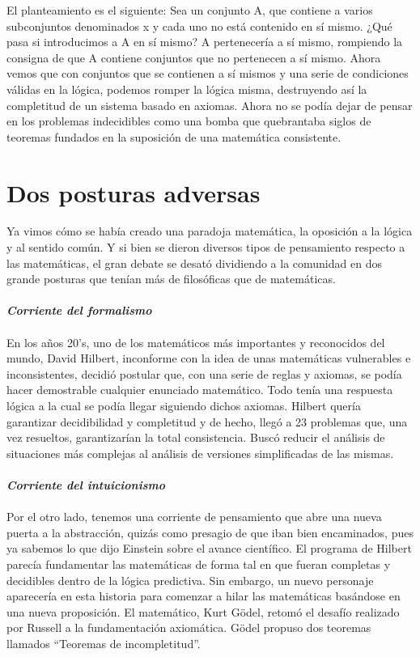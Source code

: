 \documentclass[12pt]{article}
\begin{document}
\begin{multicols}{2}
\indent \cite{CT} El planteamiento es el siguiente: Sea  un conjunto A, que contiene a varios subconjuntos denominados x y cada uno no está contenido en sí mismo. ¿Qué pasa si introducimos a A en sí mismo? A pertenecería a sí mismo, rompiendo la consigna de que A contiene conjuntos que no pertenecen a sí mismo.
Ahora vemos que con conjuntos que se contienen a sí mismos y una serie de condiciones válidas en la lógica, podemos romper la lógica misma, destruyendo así la completitud de un sistema basado en axiomas. Ahora no se podía dejar de pensar en los problemas indecidibles como una bomba que quebrantaba siglos de teoremas fundados en la suposición de una matemática consistente.
\section*{Dos posturas adversas}
Ya vimos cómo se había creado una paradoja matemática, la oposición a la lógica y al sentido común. Y si bien se dieron diversos tipos de pensamiento respecto a las matemáticas, el gran debate se desató dividiendo a la comunidad en dos grande posturas que tenían más de filosóficas que de matemáticas.\\\\
\textbf{\textsl{Corriente del formalismo}}\\\\
\indent En los años 20’s, uno de los matemáticos más importantes y reconocidos del mundo, David Hilbert, inconforme con la idea de unas matemáticas vulnerables e inconsistentes, decidió postular que, con una serie de reglas y axiomas, se podía hacer demostrable cualquier enunciado matemático.\cite{DAS} Todo tenía una respuesta lógica a la cual se podía llegar siguiendo dichos axiomas. Hilbert quería garantizar decidibilidad y completitud y de hecho, llegó a 23 problemas que, una vez resueltos, garantizarían la total consistencia. Buscó reducir el análisis de situaciones más complejas al análisis de versiones simplificadas de las mismas.\\\\
\textbf{\textsl{Corriente del intuicionismo}}\\\\
\indent Por el otro lado, tenemos una corriente de pensamiento que abre una nueva puerta a la abstracción, quizás como presagio de que iban bien encaminados, pues ya sabemos lo que dijo Einstein sobre el avance científico. El programa de Hilbert parecía fundamentar las matemáticas de forma tal en que fueran completas y decidibles dentro de la lógica predictiva. Sin embargo, un nuevo personaje aparecería en esta historia para comenzar a hilar las matemáticas basándose en una nueva proposición. El matemático, Kurt Gödel, retomó el desafío realizado por Russell a la fundamentación axiomática. Gödel propuso dos teoremas llamados “Teoremas de incompletitud”\cite{Gut}.\\\\

\end{multicols}
\end{document}
